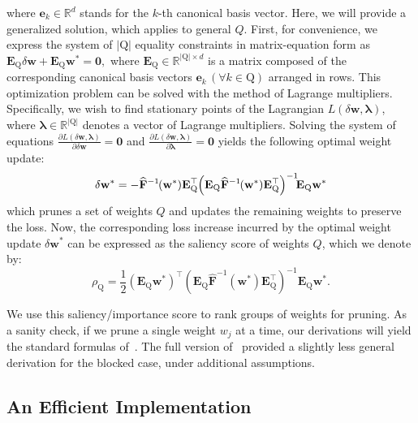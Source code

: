 \documentclass[11pt]{article}
\newcommand{\vect}[1]{\mathbf{#1}}
\newcommand{\ws}{\vect{w}^*}
\newcommand{\w}{\mathbf{w}}
\newcommand{\pr}[1]{\left(#1\right)}
\newcommand{\dw}{\delta \w}
\newcommand{\eF}{\widehat{\vect{F}}}
\newcommand{\e}{\vect{e}}
\newcommand{\E}{\vect{E}}
\newcommand{\subQ}{\textrm{Q}}
\begin{document}
\noindent where \( \e_k \in \mathbb{R}^d \) stands for the \( k \)-th canonical basis vector. Here, we will provide a generalized solution, which applies to general $Q$. 
First, for convenience, we express the system of \( |\textrm{Q}| \) equality constraints in matrix-equation form as
\(    \E_\subQ \dw + \E_\subQ\ws = \vect{0}, \)
 where \( \E_\subQ \in \mathbb{R}^{|\subQ| \times d} \) is a matrix composed of the corresponding canonical basis vectors \( \e_k\, (\forall k \in \subQ) \) arranged in rows. This optimization problem can be solved with the method of Lagrange multipliers. Specifically, we wish to find stationary points of the Lagrangian \( L(\dw, \boldsymbol{\lambda}) \), where \( \boldsymbol{\lambda} \in \mathbb{R}^{|\subQ|} \) denotes a vector of Lagrange multipliers. Solving the system of equations 
\(
    \frac{\partial L(\dw, \boldsymbol{\lambda})}{\partial \dw} = \vect{0} \) and 
\(    \frac{\partial L(\dw, \boldsymbol{\lambda})}{\partial \boldsymbol{\lambda}} = \vect{0} \)
yields the following optimal weight update:
\begin{equation*}
\label{eq:update}
    \dw^* = -\eF^{-1}\hspace*{-.1em}(\ws)\E_\subQ^\top\hspace*{-.2em}\pr{\E_\subQ \eF^{-1}\hspace*{-.1em}(\ws) \E_\subQ^\top}^{-1}\hspace*{-.4em}\E_\subQ \ws 
\end{equation*}
which prunes a set of weights $Q$ and updates the remaining weights to preserve the loss.
Now, the corresponding loss increase incurred by the optimal weight update \( \dw^* \) can be expressed as the saliency score of weights $Q$, which we denote by:
\begin{equation*}
\label{eq:saliency}
    \rho_\subQ = \frac{1}{2} \pr{\E_\subQ \w^*}^\top \pr{\E_\subQ \eF^{-1}(\ws)\E_\subQ^\top}^{-1} \E_\subQ \w^*.
\end{equation*}

We use this saliency/importance score to rank groups of weights for pruning. As a sanity check, if we prune a single weight $w_j$ at a time, our derivations will yield the standard formulas of~\cite{hassibi1993second}. The full version of~\citet{Singh2020WoodFisherES} provided a slightly less general derivation for the blocked case, under additional assumptions.  

\subsection{An Efficient Implementation}
\end{document}
